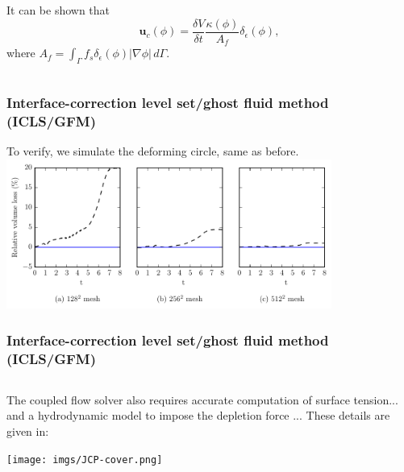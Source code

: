 \begin{frame}[t]
\begin{columns}[T]
\begin{column}{0.5\textwidth}
{\begin{bluecolorbox}
        It can be shown that
        \begin{equation}
          {\bm u}_c(\phi) = \frac{\delta V}{\delta t} \frac{\kappa(\phi)}{A_f} \delta_\epsilon (\phi),
        \end{equation}
        where $A_f = \int_\Gamma f_s \delta_\epsilon (\phi)|\nabla \phi| \,d\Gamma$.
        
      \end{bluecolorbox}
      } %
    \end{column}
    
  \end{columns}

\end{frame}
\begin{frame}[noframenumbering]
  \frametitle{Interface-correction level set/ghost fluid method (ICLS/GFM)}

  To verify, we simulate the deforming circle, same as before.
  \vskip0.2cm
  \centering
  \includegraphics[width=0.8\textwidth]{../paper1/Figures/serp_loss.pdf}
  \vskip0.3cm
  \pause

\end{frame}
\begin{frame}[noframenumbering]
  \frametitle{Interface-correction level set/ghost fluid method (ICLS/GFM)}

  \begin{columns}[T]
    
    \begin{column}{\textwidth}
      The coupled flow solver also requires accurate computation of surface tension... \vskip0.2cm
      and a hydrodynamic model to impose the depletion force ... \vskip0.2cm
      \pause
      These details are given in: \vskip0.5cm
      \centering
      \begin{tcolorbox}[beamer,
          width=0.7\textwidth,
          arc=0pt,
          boxsep=1pt,
          left=0pt,right=0pt,top=0pt,bottom=0pt,
        ]
        \texttt{[image: imgs/JCP-cover.png]}
      \end{tcolorbox}
    \end{column}
  \end{columns}

\end{frame}  
